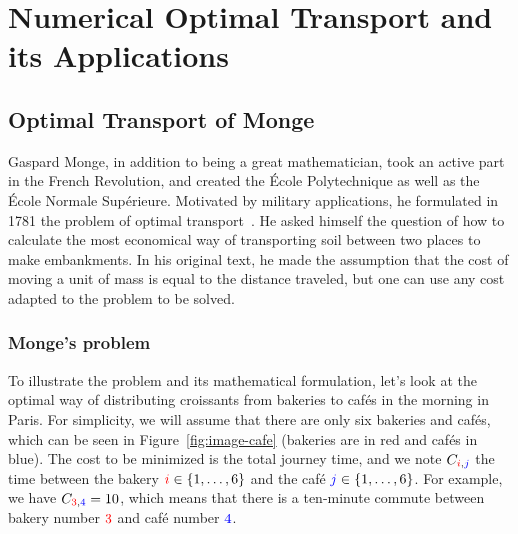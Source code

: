 
\newcommand{\Blu}[1]{{\color{blue}#1}}
\newcommand{\Red}[1]{{\color{red}#1}}
\newcommand{\iC}{\Red{i}}
\newcommand{\jC}{\Blu{j}}
\newcommand{\aC}{\Red{a}}
\newcommand{\bC}{\Blu{b}}


\ifdefined\otarticle
\newcommand{\myparagraph}[1]{\subsection{#1}}
\else
\chapter{Numerical Optimal Transport and its Applications}
\label{chap-ot}
\fi

\label{chap-ot}


\section{Optimal Transport of Monge}

Gaspard Monge, in addition to being a great mathematician, took an active part in the French Revolution, and created the \'Ecole Polytechnique as well as the \'Ecole Normale Sup\'erieure. Motivated by military applications, he formulated in 1781 the problem of optimal transport~\cite{Monge1781}. He asked himself the question of how to calculate the most economical way of transporting soil between two places to make embankments. In his original text, he made the assumption that the cost of moving a unit of mass is equal to the distance traveled, but one can use any cost adapted to the problem to be solved.

\myparagraph{Monge's problem}

To illustrate the problem and its mathematical formulation, let's look at the optimal way of distributing croissants from bakeries to caf\'es in the morning in Paris. For simplicity, we will assume that there are only six bakeries and caf\'es, which can be seen in Figure~\ref{fig:image-cafe} (bakeries are in \Red{red} and caf\'es in \Blu{blue}). The cost to be minimized is the total journey time, and we note $C_{\iC, \jC}$  the time between the bakery $\iC \in \{1, \ldots, 6\}$ and the caf\'e $\jC \in \{1, \ldots, 6\}$. For example, we have $C_{\Red{3}, \Blu{4}} = 10$, which means that there is a ten-minute commute between bakery number $\Red{3}$ and caf\'e number $\Blu{4}$.

